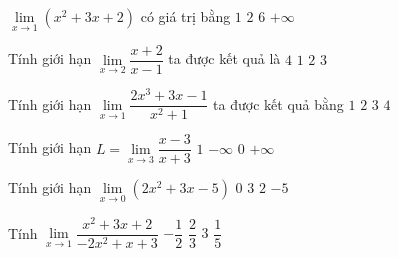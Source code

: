 

\begin{ex}%
	$\lim\limits_{x\to 1}\left( x^2+3x+2 \right)$  có giá trị bằng
	 \choice
		 {$1$}
		{$2$} 
		{\True $6$} 
		{$+\infty $} 
\end{ex}

\begin{ex}%
	Tính giới hạn $\lim\limits_{x\to  2}\dfrac{x+2}{x-1}$ ta được kết quả là
	\choice 
		{\True $4$} 
		{$1$} 
		{$2$} 
		{$3$} 
\end{ex}

\begin{ex}%
	 Tính giới hạn $\lim\limits_{x\to 1}\dfrac{2x^3+3x-1}{x^2+1}$ ta được kết quả bằng
	 \choice
		{$1$} 
		{\True  $2$}
		{$3$} 
		{$4$} 
\end{ex}

\begin{ex}%
	 Tính giới hạn $L=\lim\limits_{x\to 3}\dfrac{x-3}{x+3}$
	 \choice
		{$1$} 
		{$-\infty $} 
		{\True  $0$}
		 {$+\infty $}
\end{ex}

\begin{ex}%
	Tính giới hạn $\lim\limits_{x\to  0}\left( 2x^2+3x-5 \right)$
	\choice 
		 {$0$}
		 {$3$}
		{$2$} 
		{\True  $-5$}
\end{ex}

\begin{ex}%
	Tính  $\lim\limits_{x\to 1}\dfrac{x^2+3x+2}{-2x^2+x+3}$
	\choice 
		{$-\dfrac{1}{2}$} 
		 {$\dfrac{2}{3}$}
		{\True  $3$}
		{$\dfrac{1}{5}$} 
\end{ex}

